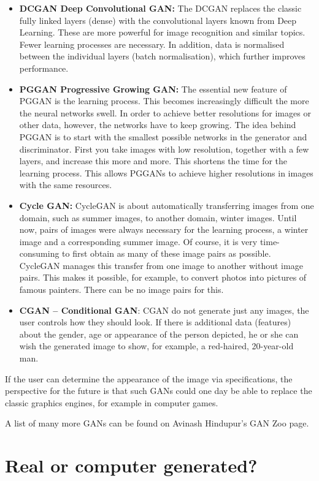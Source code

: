 \begin{itemize}
	\item \textbf{DCGAN Deep Convolutional GAN:} The DCGAN replaces the classic fully linked layers (dense) with the convolutional layers known from Deep Learning. These are more powerful for image recognition and similar topics. Fewer learning processes are necessary. In addition, data is normalised between the individual layers (batch normalisation), which further improves performance.
	\item \textbf{PGGAN Progressive Growing GAN:} The essential new feature of PGGAN is the learning process. This becomes increasingly difficult the more the neural networks swell. In order to achieve better resolutions for images or other data, however, the networks have to keep growing. The idea behind PGGAN is to start with the smallest possible networks in the generator and discriminator. First you take images with low resolution, together with a few layers, and increase this more and more. This shortens the time for the learning process. This allows PGGANs to achieve higher resolutions in images with the same resources.
	\item \textbf{Cycle GAN:} CycleGAN is about automatically transferring images from one domain, such as summer images, to another domain, winter images. Until now, pairs of images were always necessary for the learning process, a winter image and a corresponding summer image. Of course, it is very time- consuming to first obtain as many of these image pairs as possible. CycleGAN manages this transfer from one image to another without image pairs. This makes it possible, for example, to convert photos into pictures of famous painters. There can be no image pairs for this.
	\item \textbf{CGAN – Conditional GAN}: CGAN do not generate just any images, the user controls how they should look. If there is additional data (features) about the gender, age or appearance of the person depicted, he or she can wish the generated image to show, for example, a red-haired, 20-year-old man.
\end{itemize}


If the user can determine the appearance of the image via specifications, the perspective for the future is that such GANs could one day be able to replace the classic graphics engines, for example in computer games.

A list of many more GANs can be found on Avinash Hindupur's GAN Zoo page.

\section{Real or computer generated?}

